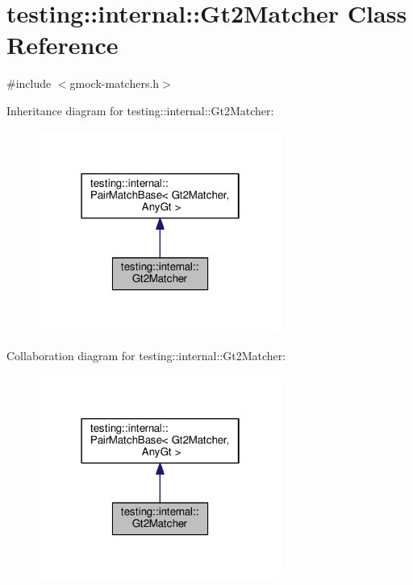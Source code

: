 \hypertarget{classtesting_1_1internal_1_1Gt2Matcher}{}\section{testing\+:\+:internal\+:\+:Gt2\+Matcher Class Reference}
\label{classtesting_1_1internal_1_1Gt2Matcher}


{\ttfamily \#include $<$gmock-\/matchers.\+h$>$}



Inheritance diagram for testing\+:\+:internal\+:\+:Gt2\+Matcher\+:
\nopagebreak
\begin{figure}[H]
\begin{center}
\leavevmode
\includegraphics[width=226pt]{classtesting_1_1internal_1_1Gt2Matcher__inherit__graph}
\end{center}
\end{figure}


Collaboration diagram for testing\+:\+:internal\+:\+:Gt2\+Matcher\+:
\nopagebreak
\begin{figure}[H]
\begin{center}
\leavevmode
\includegraphics[width=226pt]{classtesting_1_1internal_1_1Gt2Matcher__coll__graph}
\end{center}
\end{figure}
